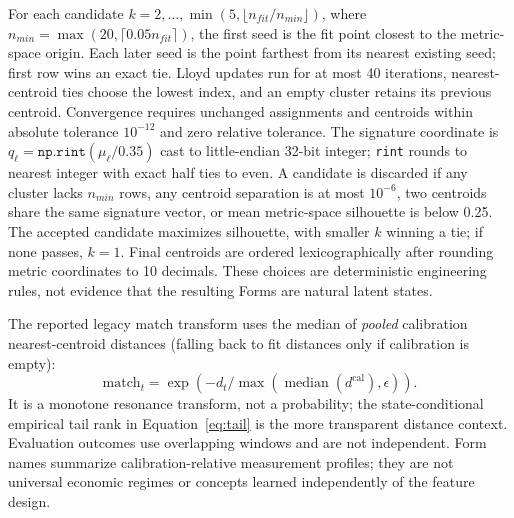 \documentclass{article}
\newcommand{\med}{\operatorname{median}}
\begin{document}
For each candidate $k=2,\ldots,\min(5,\lfloor n_{fit}/n_{min}\rfloor)$, where $n_{min}=\max(20,\lceil0.05n_{fit}\rceil)$, the first seed is the fit point closest to the metric-space origin. Each later seed is the point farthest from its nearest existing seed; first row wins an exact tie. Lloyd updates run for at most 40 iterations, nearest-centroid ties choose the lowest index, and an empty cluster retains its previous centroid. Convergence requires unchanged assignments and centroids within absolute tolerance $10^{-12}$ and zero relative tolerance. The signature coordinate is $q_\ell=\texttt{np.rint}(\mu_\ell/0.35)$ cast to little-endian 32-bit integer; \texttt{rint} rounds to nearest integer with exact half ties to even. A candidate is discarded if any cluster lacks $n_{min}$ rows, any centroid separation is at most $10^{-6}$, two centroids share the same signature vector, or mean metric-space silhouette is below 0.25. The accepted candidate maximizes silhouette, with smaller $k$ winning a tie; if none passes, $k=1$. Final centroids are ordered lexicographically after rounding metric coordinates to 10 decimals. These choices are deterministic engineering rules, not evidence that the resulting Forms are natural latent states.

The reported legacy match transform uses the median of \emph{pooled} calibration nearest-centroid distances (falling back to fit distances only if calibration is empty):
\begin{equation}
\mathrm{match}_t=\exp\left(-d_t/\max(\med(d^{\mathrm{cal}}),\epsilon)\right).
\end{equation}
It is a monotone resonance transform, not a probability; the state-conditional empirical tail rank in Equation~\ref{eq:tail} is the more transparent distance context. Evaluation outcomes use overlapping windows and are not independent. Form names summarize calibration-relative measurement profiles; they are not universal economic regimes or concepts learned independently of the feature design.

\begin{table}[h]
    \centering
    \small
    
    \caption{Daily-series dictionary diagnostics. Silhouette is zero when the support gate returns one Form. Tail $n$ counts evaluation bars with at least 20 state-conditional calibration references. The table's ``Outside'' column preserves the v1 legacy label and means upper 5\% calibration-distance tail.}
    \label{tab:assets}
\end{table}
\end{document}
